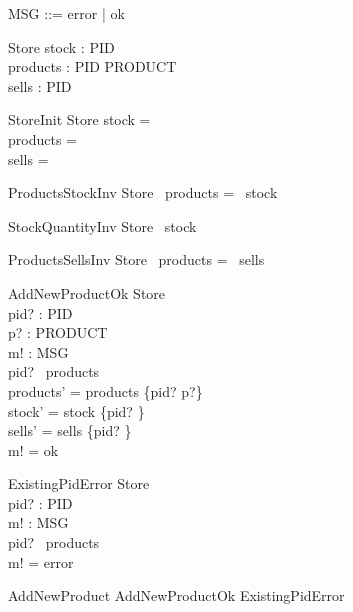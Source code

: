 \begin{zed}
\also
MSG ::= error | ok
\end{zed}

\begin{schema}{Store}
stock : PID \pfun \nat \\
products : PID \pfun PRODUCT \\
sells : PID \pfun \seq \nat
\end{schema}

\begin{schema}{StoreInit}
Store
\where
stock = \emptyset \\
products = \emptyset \\
sells = \emptyset
\end{schema}

\begin{schema}{ProductsStockInv}
Store
\where
\dom~products = \dom~stock
\end{schema}

\begin{schema}{StockQuantityInv}
Store
\where
\ran~stock \subseteq \nat
\end{schema}

\begin{schema}{ProductsSellsInv}
Store
\where
\dom~products = \dom~sells
\end{schema}

\begin{schema}{AddNewProductOk}
\Delta Store \\
pid? : PID \\
p? : PRODUCT \\
m! : MSG \\
\where
pid? \notin \dom~products \\
products' = products \cup \{pid? \mapsto p?\} \\
stock' = stock \cup \{pid? \} \\
sells' = sells \cup \{pid? \mapsto \langle \rangle\} \\
m! = ok 
\end{schema}

\begin{schema}{ExistingPidError}
\Xi Store \\
pid? : PID \\
m! : MSG \\
\where
pid? \in \dom~products \\
m! = error
\end{schema}

\begin{zed}
AddNewProduct  AddNewProductOk \lor ExistingPidError
\end{zed}

